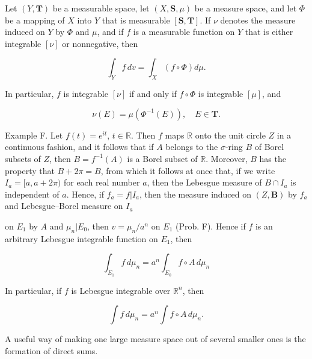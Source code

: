 Let $(Y, \mathbf{T})$ be a measurable space, let $(X, \mathbf{S}, \mu)$ be a measure space, and let $\Phi$ be a mapping of $X$ into $Y$ that is measurable $[\mathbf{S}, \mathbf{T}]$. If $\nu$ denotes the measure induced on $Y$ by $\Phi$ and $\mu$, and if $f$ is a measurable function on $Y$ that is either integrable $[\nu]$ or nonnegative, then

$$\int_Y f \, dv = \int_X (f \circ \Phi) d\mu.$$

In particular, $f$ is integrable $[\nu]$ if and only if $f \circ \Phi$ is integrable $[\mu]$, and

$$\nu(E) = \mu(\Phi^{-1}(E)), \quad E \in \mathbf{T}.$$

Example F. Let $f(t) = e^{it}$, $t \in \mathbb{R}$. Then $f$ maps $\mathbb{R}$ onto the unit circle $Z$ in a continuous fashion, and it follows that if $A$ belongs to the $\sigma$-ring $B$ of Borel subsets of $Z$, then $B = f^{-1}(A)$ is a Borel subset of $\mathbb{R}$. Moreover, $B$ has the property that $B + 2\pi = B$, from which it follows at once that, if we write $I_a = [a, a + 2\pi)$ for each real number $a$, then the Lebesgue measure of $B \cap I_a$ is independent of $a$. Hence, if $f_a = f|I_a$, then the measure induced on $(Z, \mathbf{B})$ by $f_a$ and Lebesgue–Borel measure on $I_a$

on $E_1$ by $A$ and $\mu_n|E_0$, then $v = \mu_n/a^n$ on $E_1$ (Prob. F). Hence if $f$ is an arbitrary Lebesgue integrable function on $E_1$, then

$$\int_{E_1} f \, d\mu_n = a^n \int_{E_0} f \circ A \, d\mu_n$$

In particular, if $f$ is Lebesgue integrable over $\mathbb{R}^n$, then

$$\int f \, d\mu_n = a^n \int f \circ A \, d\mu_n.$$

A useful way of making one large measure space out of several smaller ones is the formation of direct sums.
